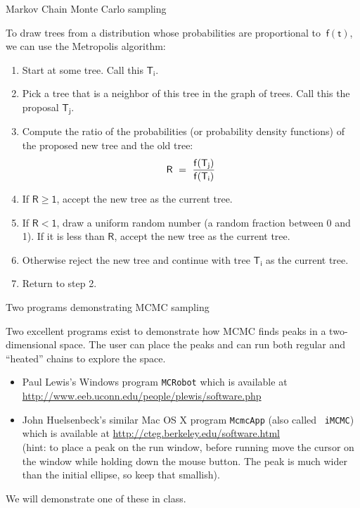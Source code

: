 \documentclass[bluish,slideColor,colorBG,pdf]{prosper}
\begin{document}
\begin{slide}[Replace]{Markov Chain Monte Carlo sampling}

To draw trees from a distribution whose probabilities are proportional to $~\mathsf{f(t)}$, we can use the Metropolis algorithm:
\begin{enumerate} 
\setlength{\itemsep}{2pt}
\item Start at some tree.  Call this $\mathsf{T_i}$.
\item Pick a tree that is a neighbor of this tree in the graph of trees.  Call
this the proposal $\mathsf{T_j}$.
\item Compute the ratio of the probabilities (or probability density
functions) of the proposed new tree and the old tree:
\[
\mathsf{R \ = \ {f(T_j) \over f(T_i)}}
\]
\item If $\mathsf{R \ge 1}$, accept the new tree as the current tree.
\item If $\mathsf{R < 1}$, draw a uniform random number (a random fraction between
0 and 1).  If it is less than $\mathsf{R}$, accept the new tree as the current tree.
\item Otherwise reject the new tree and continue with tree $\mathsf{T_i}$ as the
current tree.
\item Return to step 2.
\end{enumerate}

\end{slide}

\begin{slide}[Replace]{Two programs demonstrating MCMC sampling}
\bigskip

Two excellent programs exist to demonstrate how MCMC finds peaks in a
two-dimensional space.  The user can place the peaks and can run both
regular and ``heated'' chains to explore the space.

\begin{itemize}
\item Paul Lewis's Windows program {\tt MCRobot} which is available at
\textcolor{purple}{\href{http://www.eeb.uconn.edu/people/plewis/software.php}
{http://www.eeb.uconn.edu/people/plewis/software.php}}
\item John Huelsenbeck's similar Mac OS X program {\tt McmcApp} (also called {\tt
iMCMC}) which is available at
\textcolor{purple}{\href{http://cteg.berkeley.edu/software.html}{http://cteg.berkeley.edu/software.html}}\\
(hint: to place a peak on the run window, before running move the cursor on
the window while holding down the mouse button.  The peak is much wider than
the initial ellipse, so keep that smallish).
\end{itemize}
 
We will demonstrate one of these in class.

\end{slide}
\end{document}
